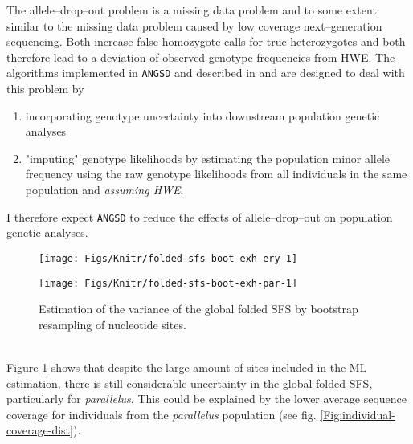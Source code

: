 \documentclass[a4paper,12pt,times,authoryear,twoside,print,index]{Classes/PhDThesisPSnPDF}\usepackage[]{graphicx}\usepackage[]{color}
\newenvironment{knitrout}{}{} %
\begin{document}
The allele--drop--out problem is a missing data problem and to some extent similar to the missing data problem caused by low coverage next--generation sequencing. Both increase false homozygote calls for true heterozygotes and both therefore lead to a deviation of observed genotype frequencies from \gls{HWE}. The algorithms implemented in \texttt{ANGSD} and described in \cite{Li2011} and \cite{Nielsen2012} are designed to deal with this problem by
\begin{enumerate}
\item incorporating genotype uncertainty into downstream population genetic analyses
\item "imputing" genotype likelihoods by estimating the population minor allele frequency using the raw genotype likelihoods from all individuals in the same population and \emph{assuming \gls{HWE}}.
\end{enumerate}
I therefore expect \texttt{ANGSD} to reduce the effects of allele--drop--out on population genetic analyses.
%
\begin{figure}[htbp]
\centering
\begin{knitrout}
\color{fgcolor}

{\centering \texttt{[image: Figs/Knitr/folded-sfs-boot-exh-ery-1]} 

}



\end{knitrout}
\begin{knitrout}
\color{fgcolor}

{\centering \texttt{[image: Figs/Knitr/folded-sfs-boot-exh-par-1]} 

}



\end{knitrout}
\caption{Estimation of the variance of the global folded \gls{SFS} by bootstrap resampling of nucleotide sites.}
\label{Fig:folded-sfs-boot-exh}
\end{figure}
%
\\
Figure \ref{Fig:folded-sfs-boot-exh} shows that despite the large amount of sites included in the ML estimation, there is still considerable uncertainty in the global folded \gls{SFS}, particularly for \textit{parallelus}. This could be explained by the lower average sequence coverage for individuals from the \textit{parallelus} population (see fig. \ref{Fig:individual-coverage-dist}).
\end{document}
